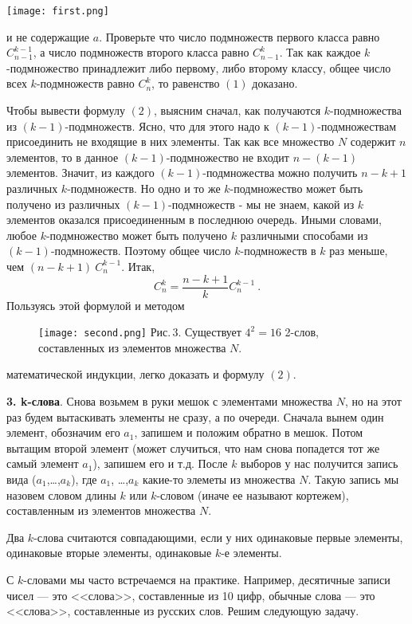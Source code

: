 \texttt{[image: first.png]}

 и не содержащие $a$. Проверьте что число подмножеств первого класса равно $C^{k-1}_{n-1}$, а число подмножеств второго класса равно $C^k_{n-1}$. Так как каждое $k$-подмножество принадлежит либо первому, либо второму классу, общее число всех $k$-подмножеств равно $C^k_n$, то равенство $ (1) $ доказано.

Чтобы вывести формулу $ (2) $, выясним сначал, как получаются $k$-подмножества из $(k-1)$-подмножеств. Ясно, что для этого надо к $(k-1)$-подмножествам присоединить не входящие в них элементы. Так как все множество $N$ содержит $n$ элементов, то в данное $(k-1)$-подмножество не входит $n-(k-1)$ элементов. Значит, из каждого $(k - 1)$-подмножества можно получить $n - k + 1$ различных $k$-подмножеств. Но одно и то же $k$-подмножество может быть получено из различных $(k - 1)$-подмножеств - мы не знаем, какой из $k$ элементов оказался присоединенным в последнюю очередь. Иными словами, любое $k$-подмножество может быть получено $k$ различными способами из $(k - 1)$-подмножеств. Поэтому общее число $k$-подмножеств в $k$ раз меньше, чем $(n - k +1)~ C^{k-1}_n$. Итак,
\[C^k_n = \frac{n-k+1}{k}C^{k-1}_{n}~.\]
Пользуясь этой формулой и методом


\begin{figure}[t]
\texttt{[image: second.png]}
\footnotesize
Рис.\,3. Существует $4^2 = 16$ 2-слов, составленных из элементов множества $N$.
\end{figure}

\noindent математической индукции, легко доказать и формулу $ (2) $.

\textbf{3. k-слова}. Снова возьмем в руки мешок с элементами множества $N$, но на этот раз будем вытаскивать элементы не сразу, а по очереди. Сначала вынем один элемент, обозначим его $a_1$, запишем и положим обратно в мешок. Потом вытащим второй элемент (может случиться, что нам снова попадется тот же самый элемент $a_1$), запишем его и т.д. После $k$ выборов у нас получится запись вида ($a_1$,\dots,$a_k$), где $a_1$, \dots,$a_k$ какие-то элеметы из множества $N$. Такую запись мы назовем словом длины $k$ или $k$-словом (иначе ее называют кортежем), составленным из элементов множества $N$.

Два $k$-слова считаются совпадающими, если у них одинаковые первые элементы, одинаковые вторые элементы, одинаковые $k$-е элементы.

С $k$-словами мы часто встречаемся на практике. Например, десятичные записи чисел --- это <<слова>>, составленные из 10 цифр, обычные слова --- это <<слова>>, составленные из русских слов. Решим следующую задачу.

